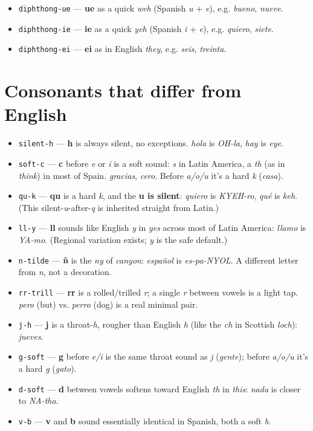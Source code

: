 \begin{itemize}
\raggedright
\setlength{\itemsep}{0.35em}
  \item \texttt{diphthong-ue} — \textbf{ue} as a quick \emph{weh} (Spanish \emph{u} + \emph{e}), e.g. \emph{bueno}, \emph{nueve}.
  \item \texttt{diphthong-ie} — \textbf{ie} as a quick \emph{yeh} (Spanish \emph{i} + \emph{e}), e.g. \emph{quiero}, \emph{siete}.
  \item \texttt{diphthong-ei} — \textbf{ei} as in English \emph{they}, e.g. \emph{seis}, \emph{treinta}.
\end{itemize}

\section*{Consonants that differ from English}

\begin{itemize}
\raggedright
\setlength{\itemsep}{0.35em}
  \item \texttt{silent-h} — \textbf{h} is always silent, no exceptions. \emph{hola} is \emph{OH-la}, \emph{hay} is \emph{eye}.
  \item \texttt{soft-c} — \textbf{c} before \emph{e} or \emph{i} is a soft sound: \emph{s} in Latin America, a \emph{th} (as in \emph{think}) in most of Spain. \emph{gracias}, \emph{cero}. Before \emph{a/o/u} it's a hard \emph{k} (\emph{casa}).
  \item \texttt{qu-k} — \textbf{qu} is a hard \emph{k}, and the \textbf{u is silent}: \emph{quiero} is \emph{KYEH-ro}, \emph{qué} is \emph{keh}. (This silent-\emph{u}-after-\emph{q} is inherited straight from Latin.)
  \item \texttt{ll-y} — \textbf{ll} sounds like English \emph{y} in \emph{yes} across most of Latin America: \emph{llamo} is \emph{YA-mo}. (Regional variation exists; \emph{y} is the safe default.)
  \item \texttt{n-tilde} — \textbf{ñ} is the \emph{ny} of \emph{canyon}: \emph{español} is \emph{es-pa-NYOL}. A different letter from \emph{n}, not a decoration.
  \item \texttt{rr-trill} — \textbf{rr} is a rolled/trilled \emph{r}; a single \emph{r} between vowels is a light tap. \emph{pero} (but) vs. \emph{perro} (dog) is a real minimal pair.
  \item \texttt{j-h} — \textbf{j} is a throat-\emph{h}, rougher than English \emph{h} (like the \emph{ch} in Scottish \emph{loch}): \emph{jueves}.
  \item \texttt{g-soft} — \textbf{g} before \emph{e/i} is the same throat sound as \emph{j} (\emph{gente}); before \emph{a/o/u} it's a hard \emph{g} (\emph{gato}).
  \item \texttt{d-soft} — \textbf{d} between vowels softens toward English \emph{th} in \emph{this}: \emph{nada} is closer to \emph{NA-tha}.
  \item \texttt{v-b} — \textbf{v} and \textbf{b} sound essentially identical in Spanish, both a soft \emph{b}.
\end{itemize}

